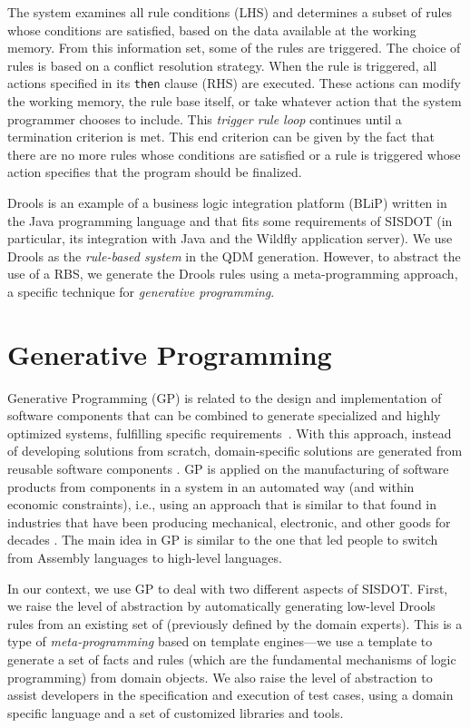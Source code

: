 The system examines all 
rule conditions (LHS) and determines a subset of rules whose conditions are satisfied, based on the data 
available at the working memory. From this information set, some of the rules are triggered. 
The choice of rules is based on a conflict resolution strategy. When the rule is triggered, 
all actions specified in its \texttt{then} clause (RHS) are executed. These actions can modify the 
working memory, the rule base itself, or take whatever action that the system programmer chooses to include. 
This \emph{trigger rule loop} continues until a termination criterion is met. This end criterion can be 
given by the fact that there are no more rules whose conditions are satisfied or a rule 
is triggered whose action specifies that the program should be finalized.

Drools is an example of a business logic integration platform (BLiP) written in the Java programming language and 
that fits some requirements of SISDOT (in particular, its integration with Java and the Wildfly application 
server). We use Drools as the \emph{rule-based system} in the QDM generation. However, to abstract the use 
of a RBS, we generate the Drools rules using a meta-programming approach, a specific technique for 
\emph{generative programming}. 

\section{Generative Programming}
\label{sec:gp}

Generative Programming (GP) is related to the design and implementation of 
software components that can be combined to generate specialized and highly 
optimized systems, fulfilling specific requirements~\cite{DBLP:phd/dnb/Czarnecki99}. 
With this approach, instead of developing solutions from scratch, domain-specific 
solutions are generated from reusable software components \cite{arora2009}. 
GP is applied on the manufacturing of software products from components in a system 
in an automated way (and within economic constraints), i.e., using an approach 
that is similar to that found in industries that have been 
producing mechanical, electronic, and other goods for decades \cite{barth2002}.
The main idea in GP is similar to the one that led people to switch from Assembly 
languages to high-level languages. 

In our context, we use GP to deal with two different aspects of SISDOT. First, 
we raise the level of abstraction by automatically generating low-level Drools 
rules from an existing set of \callers (previously defined by the domain experts). 
This is a type of \emph{meta-programming} based on template engines---we use a 
template to generate a set of facts and rules (which are the fundamental mechanisms of 
logic programming) from domain objects. We also raise the level of abstraction to 
assist developers in the specification and execution of test cases, using a 
domain specific language and a set of customized libraries and tools.  


